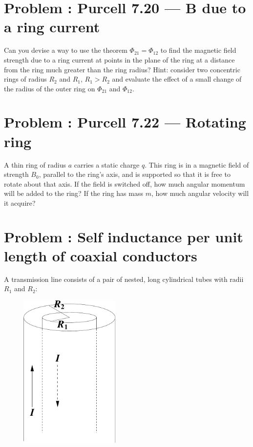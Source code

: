 \documentclass[problems]{esg8022pset}
\begin{document}
\section{Problem \thesection: Purcell 7.20 --- B due to a ring current}
Can you devise a way to use the theorem $\Phi_{21}=\Phi_{12}$ to find the magnetic
 field strength due to a ring current at points in the plane of the ring at a distance from the ring much greater than the ring radius?
 Hint: consider two concentric rings of radius $R_{2}$ and $R_{1}$, $R_{1}>R_{2}$ and evaluate the effect of a small change
  of the radius of the outer ring on $\Phi_{21}$ and $\Phi_{12}$.
\section{Problem \thesection: Purcell 7.22 --- Rotating ring}
A thin ring of radius $a$ carries a static charge $q$. This ring is in a magnetic field of strength $B_0$, parallel to the ring's axis, and is supported so that it is free to rotate about that axis. If the field is switched off, how much angular momentum will be added to the ring? If the ring has mass $m$, how much angular velocity will it acquire?
\section{Problem \thesection: Self inductance per unit length of coaxial conductors }
A transmission line consists of a pair of nested, long cylindrical
tubes with radii $R_1$ and $R_2$:

  \begin{figure}[H]
    \centering
    \includegraphics[width = 5cm]{coaxind}
    \label{fig:coax}
  \end{figure}
\end{document}
